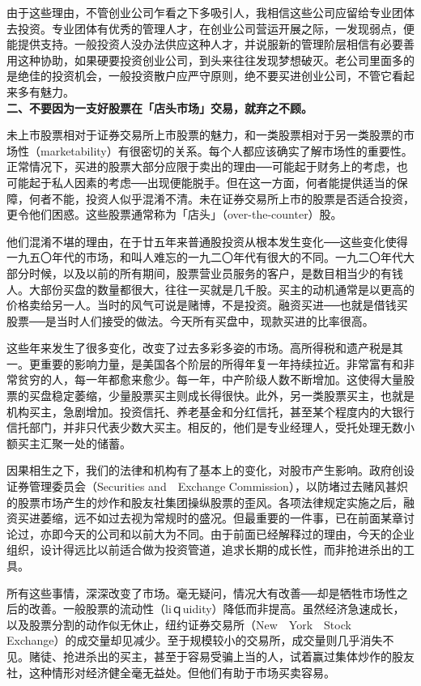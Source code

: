 \documentclass[UTF8,a4paper,zihao=-4,fontset = windows]{ctexart} %
\begin{document}
由于这些理由，不管创业公司乍看之下多吸引人，我相信这些公司应留给专业团体去投资。专业团体有优秀的管理人才，在创业公司营运开展之际，一发现弱点，便能提供支持。一般投资人没办法供应这种人才，并说服新的管理阶层相信有必要善用这种协助，如果硬要投资创业公司，到头来往往发现梦想破灭。老公司里面多的是绝佳的投资机会，一般投资散户应严守原则，绝不要买进创业公司，不管它看起来多有魅力。
\\

\textbf{二、不要因为一支好股票在「店头市场」交易，就弃之不顾。}


未上市股票相对于证券交易所上市股票的魅力，和一类股票相对于另一类股票的市场性（marketability）有很密切的关系。每个人都应该确实了解市场性的重要性。正常情况下，买进的股票大部分应限于卖出的理由──可能起于财务上的考虑，也可能起于私人因素的考虑──出现便能脱手。但在这一方面，何者能提供适当的保障，何者不能，投资人似乎混淆不清。未在证券交易所上市的股票是否适合投资，更令他们困惑。这些股票通常称为「店头」（over-the-counter）股。

他们混淆不堪的理由，在于廿五年来普通股投资从根本发生变化──这些变化使得一九五〇年代的市场，和叫人难忘的一九二〇年代有很大的不同。一九二〇年代大部分时候，以及以前的所有期间，股票营业员服务的客户，是数目相当少的有钱人。大部份买盘的数量都很大，往往一买就是几千股。买主的动机通常是以更高的价格卖给另一人。当时的风气可说是赌博，不是投资。融资买进──也就是借钱买股票──是当时人们接受的做法。今天所有买盘中，现款买进的比率很高。

这些年来发生了很多变化，改变了过去多彩多姿的市场。高所得税和遗产税是其一。更重要的影响力量，是美国各个阶层的所得年复一年持续拉近。非常富有和非常贫穷的人，每一年都愈来愈少。每一年，中产阶级人数不断增加。这使得大量股票的买盘稳定萎缩，少量股票买主则成长得很快。此外，另一类股票买主，也就是机构买主，急剧增加。投资信托、养老基金和分红信托，甚至某个程度内的大银行信托部门，并非只代表少数大买主。相反的，他们是专业经理人，受托处理无数小额买主汇聚一处的储蓄。

因果相生之下，我们的法律和机构有了基本上的变化，对股市产生影响。政府创设证券管理委员会（Securities and　Exchange Commission），以防堵过去赌风甚炽的股票市场产生的炒作和股友社集团操纵股票的歪风。各项法律规定实施之后，融资买进萎缩，远不如过去视为常规时的盛况。但最重要的一件事，已在前面某章讨论过，亦即今天的公司和以前大为不同。由于前面已经解释过的理由，今天的企业组织，设计得远比以前适合做为投资管道，追求长期的成长性，而非抢进杀出的工具。

所有这些事情，深深改变了市场。毫无疑问，情况大有改善──却是牺牲市场性之后的改善。一般股票的流动性（liｑuidity）降低而非提高。虽然经济急速成长，以及股票分割的动作似无休止，纽约证券交易所（New　York　Stock　Exchange）的成交量却见减少。至于规模较小的交易所，成交量则几乎消失不见。赌徒、抢进杀出的买主，甚至于容易受骗上当的人，试着赢过集体炒作的股友社，这种情形对经济健全毫无益处。但他们有助于市场买卖容易。
\end{document}
